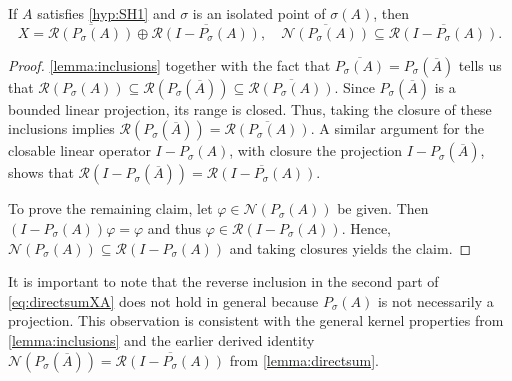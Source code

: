 \documentclass[english]{myarticle}
\begin{document}
\begin{sloppypar}
\begin{lemma} \label{lemma:directsum}
If $A$ satisfies \ref{hyp:SH1} and $\sigma$ is an isolated point of $\sigma(A)$, then
\begin{equation} \label{eq:directsumXA}
    X = \overline{\mathcal{R}(P_\sigma(A))} \oplus \overline{\mathcal{R}(I-P_\sigma(A))}, \quad \overline{\mathcal{N}(P_\sigma(A))} \subseteq \overline{\mathcal{R}(I-P_\sigma(A))}.
\end{equation}
\end{lemma}
\begin{proof}
\cref{lemma:inclusions} together with the fact that $\overline{P_\sigma(A)} = P_\sigma(\overline{A})$ tells us that $\mathcal{R}(P_\sigma(A)) \subseteq \mathcal{R}(P_\sigma(\overline{A})) \subseteq \overline{\mathcal{R}(P_\sigma(A))}$. Since $P_\sigma(\overline{A})$ is a bounded linear projection, its range is closed. Thus, taking the closure of these inclusions implies $\mathcal{R}(P_\sigma(\overline{A})) = \overline{\mathcal{R}(P_\sigma(A))}$. A similar argument for the closable linear operator $I - P_\sigma(A)$, with closure the projection $I - P_\sigma(\overline{A})$, shows that $\mathcal{R}(I - P_\sigma(\overline{A})) = \overline{\mathcal{R}(I - P_\sigma(A))}$. 

To prove the remaining claim, let $\varphi \in \mathcal{N}(P_\sigma(A))$ be given. Then $(I - P_\sigma(A))\varphi = \varphi$ and thus $\varphi \in \mathcal{R}(I-P_\sigma(A))$. Hence, $\mathcal{N}(P_\sigma(A)) \subseteq \mathcal{R}(I-P_\sigma(A))$ and taking closures yields the claim.
\end{proof}

It is important to note that the reverse inclusion in the second part of \eqref{eq:directsumXA} does not hold in general because $P_\sigma(A)$ is not necessarily a projection. This observation is consistent with the general kernel properties from \cref{lemma:inclusions} and the earlier derived identity $\mathcal{N}(P_\sigma(\overline{A})) = \overline{\mathcal{R}(I-P_\sigma(A))}$ from \cref{lemma:directsum}.


\end{sloppypar}
\end{document}

